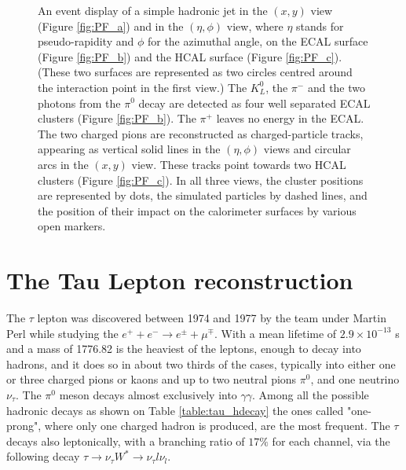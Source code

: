 \begin{figure}
	\caption{An event display of a simple hadronic jet in the $(x, y)$ view (Figure \ref{fig:PF_a}) and in the $(\eta,\phi)$ view, where $\eta$ stands for pseudo-rapidity and $\phi$ for the azimuthal angle, on the ECAL surface (Figure \ref{fig:PF_b}) and the HCAL surface (Figure \ref{fig:PF_c}). (These two surfaces are represented as two circles centred around the interaction point in the first view.) The $K^{0}_{L}$, the $\pi^{-}$ and the two photons from the $\pi^{0}$ decay are detected as four well separated ECAL clusters (Figure \ref{fig:PF_b}). The $\pi^{+}$ leaves no energy in the ECAL. The two charged pions are reconstructed as charged-particle tracks, appearing as vertical solid lines in the $(\eta,\phi)$ views and circular arcs in the $(x, y)$ view. These tracks point towards two HCAL clusters (Figure \ref{fig:PF_c}). In all three views, the cluster positions are represented by dots, the simulated particles by dashed lines, and the position of their impact on the calorimeter surfaces by various open markers.}
	\label{fig:PF_event_display}
\end{figure}

\clearpage

\section {The Tau Lepton reconstruction}

The $\tau$ lepton was discovered between 1974 and 1977 by the team under Martin Perl while studying the $e^{+}+e^{-}\longrightarrow e^{\pm}+\mu^{\mp}$. With a mean lifetime of $2.9\times10^{−13}$ s and a mass of 1776.82 \mev \cite{Agashe:2014kda} is the heaviest of the leptons, enough to decay into hadrons, and it does so in about two thirds of the cases, typically into either one or three charged pions or kaons and up to two neutral pions \ensuremath{\pi^{0}}, and one neutrino \ensuremath{\nu_{\tau}}. The \ensuremath{\pi^{0}} meson decays almost exclusively into \ensuremath{\gamma\gamma}. Among all the possible hadronic decays as shown on Table \ref{table:tau_hdecay} the ones called "one-prong", where only one charged hadron is produced, are the most frequent. The $\tau$ decays also leptonically, with a branching ratio of $17\%$ for each channel, via the following decay $\tau\longrightarrow\nu_{\tau}W^{*}\longrightarrow\nu_{\tau}l\nu_{l}$.

